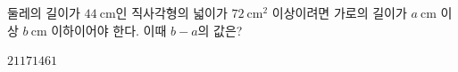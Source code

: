 둘레의 길이가 $44\ \mathrm{cm}$인 직사각형의 넓이가 $72\ \mathrm{cm}^2$ 이상이려면 가로의 길이가 $a\ \mathrm{cm}$ 이상 $b\ \mathrm{cm}$ 이하이어야 한다. 이때 $b-a$의 값은?
\begin{choices32}{$21$}{$17$}{$14$}{$6$}{$1$}\end{choices32}
